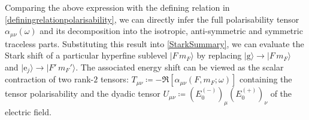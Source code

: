 \documentclass[../Thesis-IJspeert.tex]{subfiles}
\begin{document}
Comparing the above expression with the defining relation in \autoref{definingrelationpolarisability}, we can directly infer the full polarisability tensor $\alpha_{\mu\nu}(\omega)$ and its decomposition into the isotropic, anti-symmetric and symmetric traceless parts. Substituting this result into \autoref{StarkSummary}, we can evaluate the Stark shift of a particular hyperfine sublevel $\vert F\,m_F \rangle$ by replacing $\vert \mathrm{g} \rangle \rightarrow \vert F\,m_F \rangle$ and $\vert \mathrm{e}_j \rangle \rightarrow \vert F'\,m_F' \rangle$. The associated energy shift can be viewed as the scalar contraction of two rank-$2$ tensors: $T_{\mu\nu}\coloneqq-\Re [ \alpha_{\mu \nu}(F,m_F;\omega) ]$ containing the tensor polarisability and the dyadic tensor $U_{\mu\nu}\coloneqq( E_0^{(-)} )_\mu ( E_0^{(+)} )_\nu$ of the electric field.
\end{document}
